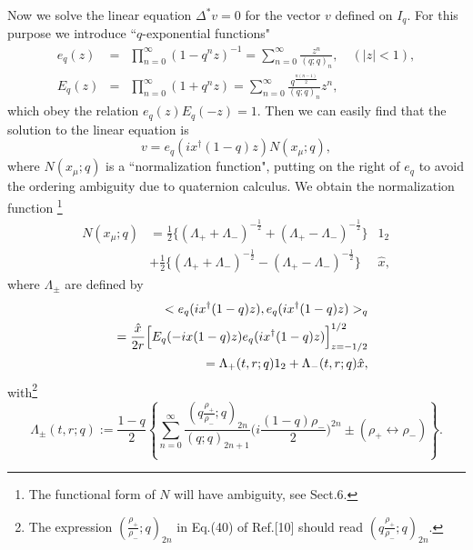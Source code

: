 \documentclass[a4paper,10pt]{article}
\begin{document}
Now we solve the linear equation $\Delta^*v=0$ for the vector $v$ defined on $I_q$.
For this purpose we introduce ``$q$-exponential functions"
\begin{eqnarray}
e_q(z)&=&\prod^{\infty}_{n=0}(1-q^nz)^{-1}=\sum^\infty_{n=0}\frac{z^n}{(q;q)_n}, \quad(|z|<1),\\
E_q(z)&=&\prod^{\infty}_{n=0}(1+q^nz)=\sum^\infty_{n=0}\frac{q^{\frac{n(n-1)}{2}}}{(q;q)_n}z^n,
\end{eqnarray}
which obey the relation $e_q(z)E_q(-z)=1$. 
Then we can easily find that the solution to the linear equation is 
\begin{equation}
v=e_q(ix^\dagger (1-q)z)N(x_\mu;q),\label{v=eN}
\end{equation}
where $N(x_\mu;q)$ is a ``normalization function", putting on the right of $e_q$ to avoid the ordering ambiguity due to quaternion calculus.
We obtain the normalization function \footnote[1]{The functional form of $N$ will have ambiguity, see Sect.6.}
\begin{eqnarray}
N(x_\mu;q)&=\frac{1}{2}\{(\Lambda_++\Lambda_-)^{-\frac{1}{2}}+(\Lambda_+-\Lambda_-)^{-\frac{1}{2}}\}&1_2\nonumber\\
&+\frac{1}{2}\{(\Lambda_++\Lambda_-)^{-\frac{1}{2}}-(\Lambda_+-\Lambda_-)^{-\frac{1}{2}}\}&\hat x, \label{N}
\end{eqnarray}
where $\Lambda_{\pm}$ are defined by
\begin{eqnarray}
&&<e_q(ix^\dagger (1-q)z),e_q(ix^\dagger (1-q)z)>_q \nonumber\\
&&=\frac{\hat x}{2r}\Bigl[E_q(-ix(1-q)z)e_q(ix^\dagger (1-q)z)\Bigr]^{1/2}_{z=-1/2}\nonumber\\
&&=\Lambda_+(t,r;q)1_2+\Lambda_-(t,r;q)\hat x,\label{e,e}
\end{eqnarray}
with\footnote{The expression $(\frac{\rho_+}{\rho_-};q)_{2n}$ in Eq.(40) of Ref.[10] should read $(q\frac{\rho_+}{\rho_-};q)_{2n}$.}  
\begin{equation}
\Lambda_\pm(t,r;q)
:=\frac{1-q}{2}\left\{\sum_{n=0}^\infty\frac{(q\frac{\rho_+}{\rho_-};q)_{2n}}{(q;q)_{2n+1}}\biggl(i\frac{(1-q)\rho_-}{2}\biggr)^{2n}\pm (\rho_+\leftrightarrow\rho_-)\right\}.\label{Apm}
\end{equation}
\end{document}

